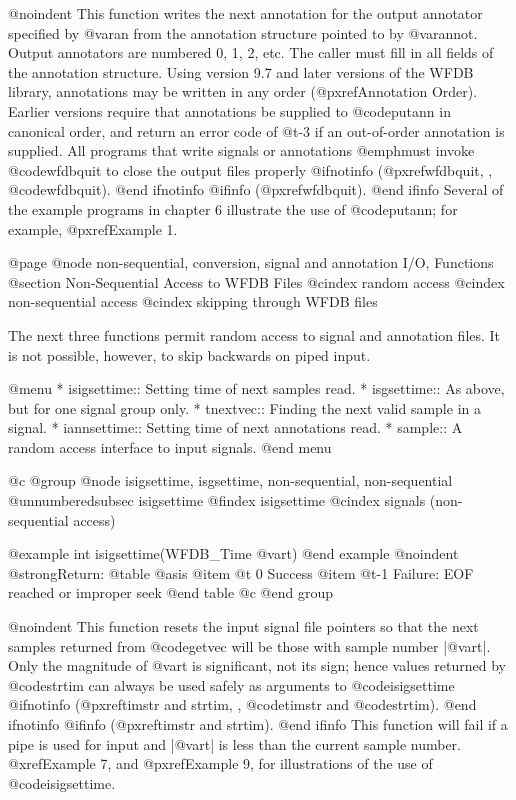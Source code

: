 {{{{{{{{@noindent
This function writes the next annotation for the output annotator specified by
@var{an} from the annotation structure pointed to by @var{annot}.  Output
annotators are numbered 0, 1, 2, etc.  The caller must fill in all fields of
the annotation structure.  Using version 9.7 and later versions of the WFDB
library, annotations may be written in any order (@pxref{Annotation Order}).
Earlier versions require that annotations be supplied to @code{putann} in
canonical order, and return an error code of @t{-3} if an out-of-order
annotation is supplied.  All programs that write signals or annotations
@emph{must} invoke @code{wfdbquit} to close the output files properly
@ifnotinfo
(@pxref{wfdbquit, , @code{wfdbquit}}).
@end ifnotinfo
@ifinfo
(@pxref{wfdbquit}).
@end ifinfo
Several of the example programs in chapter 6 illustrate the use of
@code{putann}; for example, @pxref{Example 1}.

@page
@node     non-sequential, conversion, signal and annotation I/O, Functions
@section Non-Sequential Access to WFDB Files
@cindex random access
@cindex non-sequential access
@cindex skipping through WFDB files

The next three functions permit random access to signal and annotation
files.  It is not possible, however, to skip backwards on piped
input.

@menu
* isigsettime::			Setting time of next samples read.
* isgsettime::			As above, but for one signal group only.
* tnextvec::                    Finding the next valid sample in a signal.
* iannsettime::			Setting time of next annotations read.
* sample::			A random access interface to input signals.
@end menu

@c @group
@node     isigsettime, isgsettime, non-sequential, non-sequential
@unnumberedsubsec isigsettime
@findex isigsettime
@cindex signals (non-sequential access)

@example
int isigsettime(WFDB_Time @var{t})
@end example
@noindent
@strong{Return:}
@table @asis
@item @t{ 0}
Success
@item @t{-1}
Failure: EOF reached or improper seek
@end table
@c @end group

@noindent
This function resets the input signal file pointers so that the next
samples returned from @code{getvec} will be those with sample number
|@var{t}|.  Only the magnitude of @var{t} is significant, not its sign;
hence values returned by @code{strtim} can always be used safely as
arguments to @code{isigsettime}
@ifnotinfo
(@pxref{timstr and strtim, , @code{timstr} and @code{strtim}}).
@end ifnotinfo
@ifinfo
(@pxref{timstr and strtim}).
@end ifinfo
This function will fail if a pipe is used for input and |@var{t}| is less
than the current sample number.  @xref{Example 7}, and @pxref{Example 9},
for illustrations of the use of @code{isigsettime}.

}}}}}}}}
